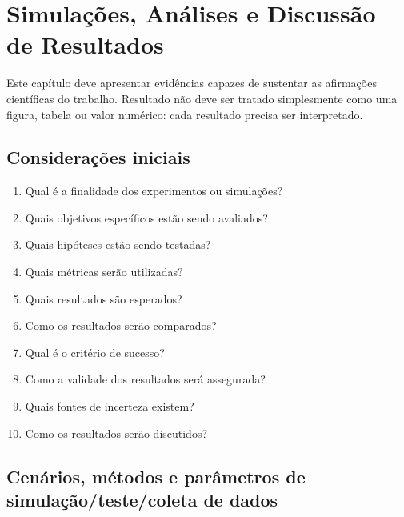 \chapter{Simulações, Análises e Discussão de Resultados}

Este capítulo deve apresentar evidências capazes de sustentar as afirmações
científicas do trabalho. Resultado não deve ser tratado simplesmente como uma
figura, tabela ou valor numérico: cada resultado precisa ser interpretado.

\section{Considerações iniciais}

\begin{enumerate}
	\item Qual é a finalidade dos experimentos ou simulações?
	\item Quais objetivos específicos estão sendo avaliados?
	\item Quais hipóteses estão sendo testadas?
	\item Quais métricas serão utilizadas?
	\item Quais resultados são esperados?
	\item Como os resultados serão comparados?
	\item Qual é o critério de sucesso?
	\item Como a validade dos resultados será assegurada?
	\item Quais fontes de incerteza existem?
	\item Como os resultados serão discutidos?
\end{enumerate}

\section{Cenários, métodos e parâmetros de simulação/teste/coleta de dados}

